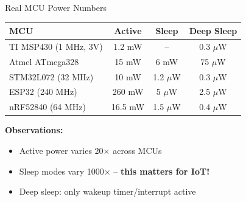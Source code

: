 \documentclass[aspectratio=169,11pt]{beamer}
\begin{document}
\begin{frame}{Real MCU Power Numbers}
    \begin{table}
        \centering
        \begin{tabular}{@{}lccc@{}}
            \toprule
            \textbf{MCU} & \textbf{Active} & \textbf{Sleep} & \textbf{Deep Sleep} \\
            \midrule
            TI MSP430 (1 MHz, 3V) & 1.2 mW & -- & 0.3 $\mu$W \\
            Atmel ATmega328 & 15 mW & 6 mW & 75 $\mu$W \\
            STM32L072 (32 MHz) & 10 mW & 1.2 $\mu$W & 0.3 $\mu$W \\
            ESP32 (240 MHz) & 260 mW & 5 $\mu$W & 2.5 $\mu$W \\
            nRF52840 (64 MHz) & 16.5 mW & 1.5 $\mu$W & 0.4 $\mu$W \\
            \bottomrule
        \end{tabular}
    \end{table}
    
    \vspace{0.3cm}
    \textbf{Observations:}
    \begin{itemize}
        \item Active power varies 20$\times$ across MCUs
        \item Sleep modes vary 1000$\times$ -- \textbf{this matters for IoT!}
        \item Deep sleep: only wakeup timer/interrupt active
    \end{itemize}
\end{frame}
\end{document}
